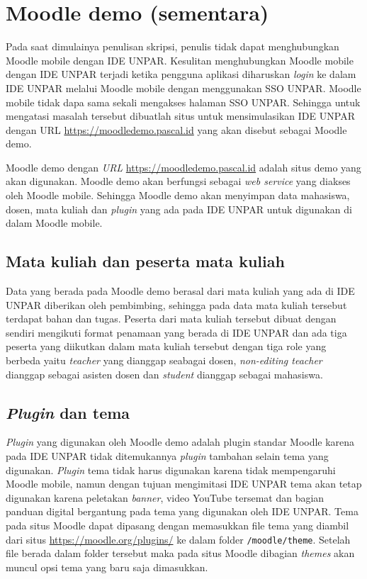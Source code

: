
\section{Moodle demo (sementara)}

Pada saat dimulainya penulisan skripsi, penulis tidak dapat menghubungkan Moodle mobile dengan IDE UNPAR. Kesulitan menghubungkan Moodle mobile dengan IDE UNPAR terjadi ketika pengguna aplikasi diharuskan \textit{login} ke dalam IDE UNPAR melalui Moodle mobile dengan menggunakan SSO UNPAR. Moodle mobile tidak dapa sama sekali mengakses halaman SSO UNPAR. Sehingga untuk mengatasi masalah tersebut dibuatlah situs untuk mensimulasikan IDE UNPAR dengan URL \url{https://moodledemo.pascal.id} yang akan disebut sebagai Moodle demo.

Moodle demo dengan \textit{URL} \url{https://moodledemo.pascal.id} adalah situs demo yang akan digunakan. Moodle demo akan berfungsi sebagai \textit{web service} yang diakses oleh Moodle mobile. Sehingga Moodle demo akan menyimpan data mahasiswa, dosen, mata kuliah dan \textit{plugin} yang  ada pada IDE UNPAR untuk digunakan di dalam Moodle mobile. 
\subsection{Mata kuliah dan peserta mata kuliah}

Data yang berada pada Moodle demo berasal dari mata kuliah yang ada di IDE UNPAR diberikan oleh pembimbing, sehingga pada data mata kuliah tersebut terdapat bahan dan tugas. Peserta dari mata kuliah tersebut dibuat dengan sendiri mengikuti format penamaan yang berada di IDE UNPAR dan ada tiga peserta yang diikutkan dalam mata kuliah tersebut dengan tiga role yang berbeda yaitu \textit{teacher} yang dianggap seabagai dosen, \textit{non-editing teacher} dianggap sebagai asisten dosen dan \textit{student} dianggap sebagai mahasiswa.

\subsection{\textit{Plugin} dan tema}

\textit{Plugin} yang digunakan oleh Moodle demo adalah plugin standar Moodle karena pada IDE UNPAR tidak ditemukannya \textit{plugin} tambahan selain tema yang digunakan. \textit{Plugin} tema tidak harus digunakan karena tidak mempengaruhi Moodle mobile, namun dengan tujuan mengimitasi IDE UNPAR tema akan tetap digunakan karena peletakan \textit{banner}, video YouTube tersemat dan bagian panduan digital bergantung pada tema yang digunakan oleh IDE UNPAR. Tema pada situs Moodle dapat dipasang dengan memasukkan file tema yang diambil dari situs \url{https://moodle.org/plugins/} ke dalam folder \texttt{/moodle/theme}. Setelah file berada dalam folder tersebut maka pada situs Moodle dibagian \textit{themes} akan muncul opsi tema yang baru saja dimasukkan.

